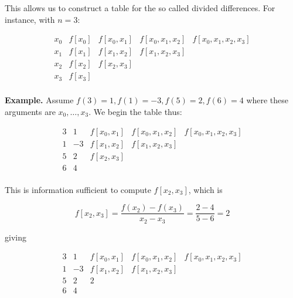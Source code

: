 \documentclass[12pt]{article}
\theoremstyle{definition}
\begin{document}
This allows us to construct a table for the so called divided differences. For
instance, with $n = 3$:

\begin{equation*}
    \begin{array}{c|c|c|c|c}
x_0 & f[x_0] & f[x_0,x_1] & f[x_0,x_1,x_2] & f[x_0,x_1,x_2,x_3] \\
x_1 & f[x_1] & f[x_1,x_2] & f[x_1,x_2,x_3] & \\
x_2 & f[x_2] & f[x_2,x_3] & & \\
x_3 & f[x_3] & & & \\
\end{array}
\end{equation*}

\begin{shaded}
    \textbf{Example.} Assume $f(3) = 1, f(1) = -3, f(5) = 2, f(6) = 4$ where
    these arguments are $x_0, \ldots, x_3$. We begin the  table thus:


    \begin{equation*}
        \begin{array}{c|c|c|c|c}
    3 & 1 & f[x_0,x_1] & f[x_0,x_1,x_2] & f[x_0,x_1,x_2,x_3] \\
    1 & -3 & f[x_1,x_2] & f[x_1,x_2,x_3] & \\
    5 & 2 & f[x_2,x_3] & & \\
    6 & 4 & & & \\
    \end{array}
    \end{equation*}

    This is information sufficient to compute $f[x_2, x_3]$, which is 

    \begin{equation*}
        f[x_2, x_3] = \frac{f(x_2) - f(x_3)}{x_2 - x_3} = \frac{2 - 4}{5 - 6} =
        2
    \end{equation*}

    giving 


    \begin{equation*}
        \begin{array}{c|c|c|c|c}
    3 & 1 & f[x_0,x_1] & f[x_0,x_1,x_2] & f[x_0,x_1,x_2,x_3] \\
    1 & -3 & f[x_1,x_2] & f[x_1,x_2,x_3] & \\
    5 & 2 & 2 & & \\
    6 & 4 & & & \\
    \end{array}
    \end{equation*}


\end{shaded}
\end{document}
